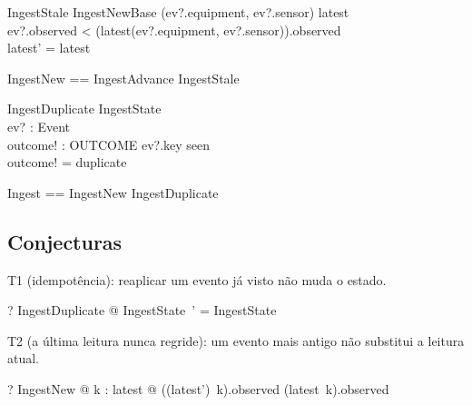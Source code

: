 \documentclass{article}
\begin{document}
\begin{schema}{IngestStale}
  IngestNewBase
\where
  (ev?.equipment, ev?.sensor) \in \dom latest \\
  ev?.observed < (latest(ev?.equipment, ev?.sensor)).observed \\
  latest' = latest
\end{schema}

\begin{zed}
  IngestNew == IngestAdvance \lor IngestStale
\end{zed}

\begin{schema}{IngestDuplicate}
  \Xi IngestState \\
  ev? : Event \\
  outcome! : OUTCOME
\where
  ev?.key \in seen \\
  outcome! = duplicate
\end{schema}

\begin{zed}
  Ingest == IngestNew \lor IngestDuplicate
\end{zed}

\subsection*{Conjecturas}

T1 (idempotência): reaplicar um evento já visto não muda o estado.

\begin{zed}
  \vdash? \forall IngestDuplicate @ \theta IngestState~' = \theta IngestState
\end{zed}

T2 (a última leitura nunca regride): um evento mais antigo não substitui a leitura atual.

\begin{zed}
  \vdash? \forall IngestNew @ \forall k : \dom latest @
    ((latest')~k).observed \geq (latest~k).observed
\end{zed}
\end{document}
